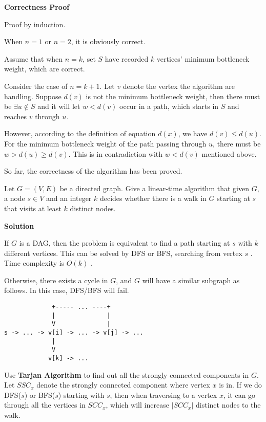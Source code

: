 \documentclass{article}
\newcounter{exercise}
\newcommand{\<}{
    \langle}
\renewcommand{\>}{
    \rangle}
\begin{document}
{\bigskip
\noindent \textbf{Correctness Proof}

Proof by induction.

When $n=1$ or $n=2$, it is obviously correct.

Assume that when $n=k$, set $S$ have recorded $k$ vertices' minimum bottleneck weight, which are correct.

Consider the case of $n = k+1$. Let $v$ denote the vertex the algorithm are handling. Suppose $d(v)$ is not the minimum bottleneck weight, then there must be $\exists u \notin S$ and it will let $w < d(v)$ occur in a path, which starts in $S$ and reaches $v$ through $u$.

However, according to the definition of equation $d(x)$, we have $d(v) \le d(u)$. For the minimum bottleneck weight of the path passing through $u$, there must be $w > d(u) \ge d(v)$. This is in contradiction with $w < d(v)$ mentioned above.

So far, the correctness of the algorithm has been proved.


\begin{exercise}
Let $G=(V,E)$ be a directed graph. Give a linear-time algorithm that given $G$, a node $s\in V$ and an integer $k$ decides whether there is a walk in $G$ starting at $s$ that visits at least $k$ distinct nodes.
\end{exercise}

\bigskip
\noindent \textbf{Solution}

If $G$ is a DAG, then the problem is equivalent to find a path starting at $s$ with $k$ different vertices. This can be solved by DFS or BFS, searching from vertex $s$ . Time complexity is $O(k)$ .

Otherwise, there exists a cycle in $G$, and $G$ will have a similar subgraph as follows. In this case, DFS/BFS will fail.
\begin{lstlisting}
             +----- ... ----+
             |              |
             V              |
s -> ... -> v[i] -> ... -> v[j] -> ...
             |
             V
            v[k] -> ...
\end{lstlisting}

Use \textbf{Tarjan Algorithm} to find out all the strongly connected components in $G$. Let $SSC_x$ denote the strongly connected component where vertex $x$ is in.
If we do DFS($s$) or BFS($s$) starting with $s$, then when traversing to a vertex $x$, it can go through all the vertices in $SCC_x$, which will increase $|SCC_x|$ distinct nodes to the walk.

}
\end{document}
